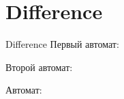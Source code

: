 \section{Difference}
\begin{frame}{Difference}
	Первый автомат:


	Второй автомат:


	Автомат:


\end{frame}
